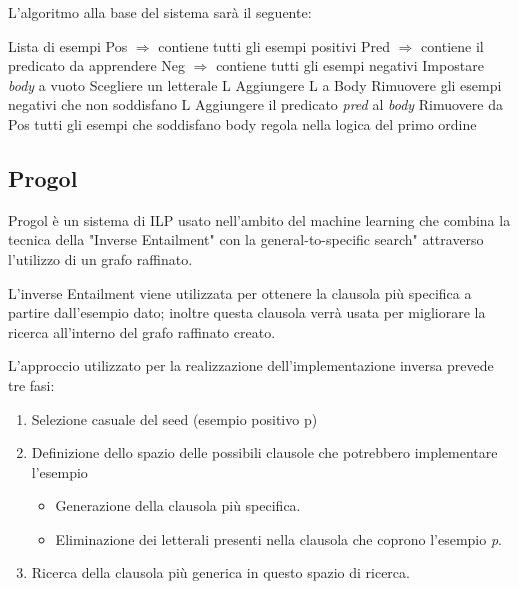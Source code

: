 L'algoritmo alla base del sistema sarà il seguente:
\begin{algorithm}
	\begin{algorithmic}[1]
		\REQUIRE Lista di esempi
		\STATE Pos $\Rightarrow$ contiene tutti gli esempi positivi
		\STATE Pred $\Rightarrow$ contiene il predicato da apprendere
		\STATE Neg $\Rightarrow$ contiene tutti gli esempi negativi
		\STATE Impostare \textit{body} a vuoto
		\STATE Scegliere un letterale L
		\STATE Aggiungere L a Body
		\STATE Rimuovere gli esempi negativi che non soddisfano L
		\ENDWHILE
		\STATE Aggiungere il predicato \textit{pred} al \textit{body}
		\STATE Rimuovere da Pos tutti gli esempi che soddisfano body
		\ENDWHILE
		\ENDFOR
		\RETURN regola nella logica del primo ordine
	\end{algorithmic}
\end{algorithm}

\subsection{Progol}
Progol è un sistema di ILP usato nell'ambito del machine learning che combina la tecnica della "Inverse Entailment" con la general-to-specific search" attraverso l'utilizzo di un grafo raffinato. \cite{Muggleton1995}

L'inverse Entailment viene utilizzata per ottenere la clausola più specifica a partire dall'esempio dato; inoltre questa clausola verrà usata per migliorare la ricerca all'interno del grafo raffinato creato.

L'approccio utilizzato per la realizzazione dell'implementazione inversa prevede tre fasi:

\begin{enumerate}
\item Selezione casuale del seed (esempio positivo p)
\item Definizione dello spazio delle possibili clausole che potrebbero implementare l'esempio
	\begin{itemize}
		\item Generazione della clausola più specifica.
		\item Eliminazione dei letterali presenti nella clausola che coprono l'esempio \emph{p}.
	\end{itemize}
\item Ricerca della clausola più generica in questo spazio di ricerca.
\end{enumerate}


